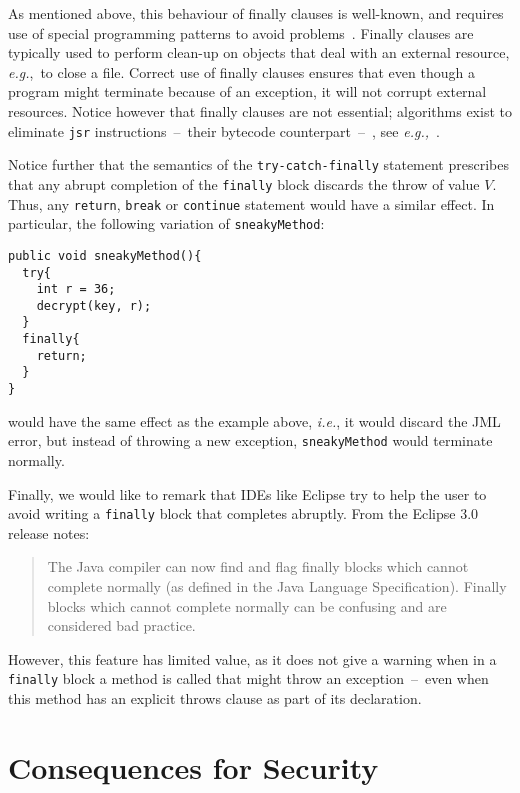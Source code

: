 \documentclass[]{llncs}
\begin{document}
As mentioned above, this behaviour of finally clauses is well-known, and
requires use of special programming patterns to avoid
problems~\cite{Eckel02,Jenkov-online}. Finally clauses are typically
used to perform clean-up on objects that deal with an external
resource, \emph{e.g.},\ to close a file. Correct use of finally
clauses ensures that even though a program might terminate because of
an exception, it will not corrupt external resources. Notice however
that finally clauses are not essential; algorithms exist to eliminate
\texttt{jsr} instructions~--~their bytecode counterpart~--~, see
\emph{e.g.,}~\cite{ArthoB05}.

Notice further that the semantics of the \texttt{try-catch-finally}
statement prescribes that any abrupt completion of the
\texttt{finally} block discards the throw of value \(V\). Thus, any
\texttt{return}, \texttt{break} or \texttt{continue} statement would
have a similar effect. In particular, the following variation of
\texttt{sneakyMethod}: 
\begin{verbatim}
public void sneakyMethod(){
  try{ 
    int r = 36; 
    decrypt(key, r);                                           
  }           
  finally{
    return;
  }
}
\end{verbatim}
would have the same effect as the example above, \emph{i.e.}, it would
discard the JML error, but instead of throwing a new exception,
\texttt{sneakyMethod} would terminate normally.

Finally, we would like to remark that IDEs like Eclipse try to help
the user to avoid writing a \texttt{finally} block that completes
abruptly. From the Eclipse 3.0 release notes:

\begin{quotation}
The Java compiler can now find and flag finally blocks which cannot
complete normally  (as defined in the Java Language
Specification). Finally blocks which cannot complete normally can be
confusing and are considered bad practice.
\end{quotation}

However, this feature has limited value, as it does not give a warning
when in a \texttt{finally} block a method is called that might throw
an exception~--~even when this method has an explicit throws clause as
part of its declaration.


\section{Consequences for Security}\label{SecExploiting}
\end{document}
